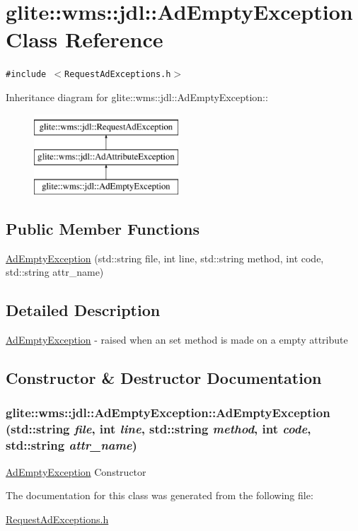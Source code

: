 \hypertarget{classglite_1_1wms_1_1jdl_1_1AdEmptyException}{
\section{glite::wms::jdl::Ad\-Empty\-Exception Class Reference}
\label{classglite_1_1wms_1_1jdl_1_1AdEmptyException}
}
{\tt \#include $<$Request\-Ad\-Exceptions.h$>$}

Inheritance diagram for glite::wms::jdl::Ad\-Empty\-Exception::\begin{figure}[H]
\begin{center}
\leavevmode
\includegraphics[height=3cm]{classglite_1_1wms_1_1jdl_1_1AdEmptyException}
\end{center}
\end{figure}
\subsection*{Public Member Functions}
\begin{CompactItemize}
\item 
\hyperlink{classglite_1_1wms_1_1jdl_1_1AdEmptyException_a0}{Ad\-Empty\-Exception} (std::string file, int line, std::string method, int code, std::string attr\_\-name)
\end{CompactItemize}


\subsection{Detailed Description}
\hyperlink{classglite_1_1wms_1_1jdl_1_1AdEmptyException}{Ad\-Empty\-Exception} - raised when an set method is made on a empty attribute 



\subsection{Constructor \& Destructor Documentation}
\hypertarget{classglite_1_1wms_1_1jdl_1_1AdEmptyException_a0}{
\subsubsection[AdEmptyException]{\setlength{\rightskip}{0pt plus 5cm}glite::wms::jdl::Ad\-Empty\-Exception::Ad\-Empty\-Exception (std::string {\em file}, int {\em line}, std::string {\em method}, int {\em code}, std::string {\em attr\_\-name})}}
\label{classglite_1_1wms_1_1jdl_1_1AdEmptyException_a0}


\hyperlink{classglite_1_1wms_1_1jdl_1_1AdEmptyException}{Ad\-Empty\-Exception} Constructor 

The documentation for this class was generated from the following file:\begin{CompactItemize}
\item 
\hyperlink{RequestAdExceptions_8h}{Request\-Ad\-Exceptions.h}\end{CompactItemize}
